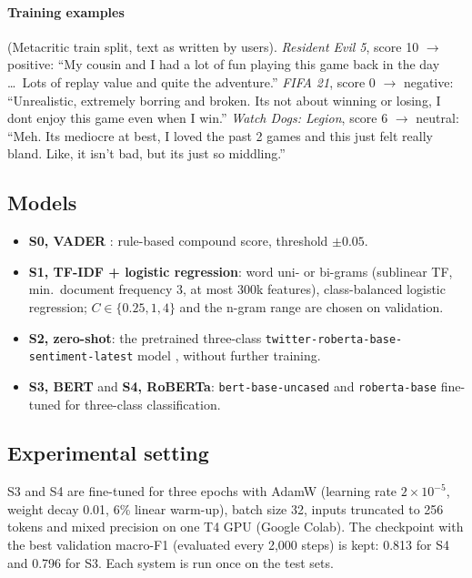 \documentclass[11pt,a4paper]{article}
\begin{document}
\paragraph{Training examples} (Metacritic train split, text as written by users).
\emph{Resident Evil 5}, score 10 $\rightarrow$ positive: ``My cousin and I had a lot of fun
playing this game back in the day \dots\ Lots of replay value and quite the adventure.''
\emph{FIFA 21}, score 0 $\rightarrow$ negative: ``Unrealistic, extremely borring and broken. Its
not about winning or losing, I dont enjoy this game even when I win.''
\emph{Watch Dogs: Legion}, score 6 $\rightarrow$ neutral: ``Meh. Its mediocre at best, I loved
the past 2 games and this just felt really bland. Like, it isn't bad, but its just so
middling.''

\subsection{Models}

\begin{itemize}
  \item \textbf{S0, VADER} \citep{hutto2014vader}: rule-based compound score, threshold
    $\pm0.05$.
  \item \textbf{S1, TF-IDF + logistic regression}: word uni- or bi-grams (sublinear TF,
    min.\ document frequency 3, at most 300k features), class-balanced logistic regression;
    $C\in\{0.25,1,4\}$ and the n-gram range are chosen on validation.
  \item \textbf{S2, zero-shot}: the pretrained three-class
    \texttt{twitter-roberta-base-sentiment-latest} model \citep{barbieri2020tweeteval},
    without further training.
  \item \textbf{S3, BERT} and \textbf{S4, RoBERTa}: \texttt{bert-base-uncased}
    \citep{devlin2019bert} and \texttt{roberta-base} \citep{liu2019roberta} fine-tuned for
    three-class classification.
\end{itemize}

\subsection{Experimental setting}

S3 and S4 are fine-tuned for three epochs with AdamW (learning rate $2\times10^{-5}$, weight
decay 0.01, 6\% linear warm-up), batch size 32, inputs truncated to 256 tokens and mixed
precision on one T4 GPU (Google Colab). The checkpoint with the best validation macro-F1
(evaluated every 2,000 steps) is kept: 0.813 for S4 and 0.796 for S3. Each system is run once
on the test sets.
\end{document}
